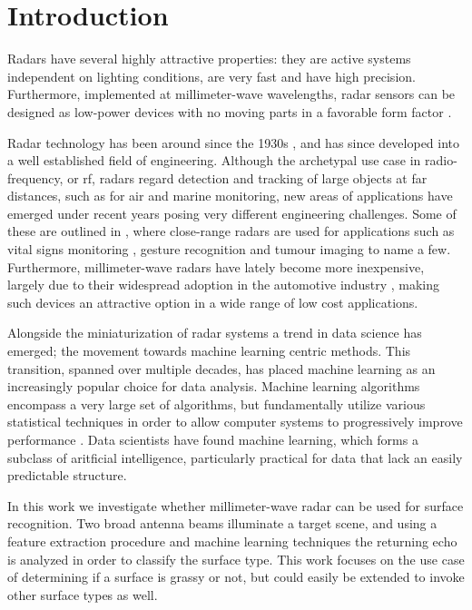 \chapter{Introduction}


Radars have several highly attractive properties: they are active systems independent on lighting conditions, are very fast and have high precision. Furthermore, implemented at millimeter-wave wavelengths, radar sensors can be designed as low-power devices with no moving parts in a favorable form factor \citep{lien_gillian_karagozler_amihood_schwesig_olson_raja_poupyrev_2016}.

Radar technology has been around since the 1930s \citep{watson-watt_1945}, and has since developed into a well established field of engineering. Although the archetypal use case in radio-frequency, or \gls{rf}, radars regard detection and tracking of large objects at far distances, such as for air and marine monitoring, new areas of applications have emerged under recent years posing very different engineering challenges. Some of these are outlined in \citep{amin_2017}, where close-range radars are used for applications such as vital signs monitoring \citep{kuo_lin_yu_lo_lyu_chou_chuang_2016}, gesture recognition \citep{lien_gillian_karagozler_amihood_schwesig_olson_raja_poupyrev_2016} and tumour imaging \citep{klemm_gibbins_leendertz_horseman_preece_benjamin_craddock_2011} to name a few. Furthermore, millimeter-wave radars have lately become more inexpensive, largely due to their widespread adoption in the automotive industry \citep{frenzel_2018}, making such devices an attractive option in a wide range of low cost applications.

Alongside the miniaturization of radar systems a trend in data science has emerged; the movement towards machine learning centric methods. This transition, spanned over multiple decades, has placed machine learning as an increasingly popular choice for data analysis. Machine learning algorithms encompass a very large set of algorithms, but fundamentally utilize various statistical techniques in order to allow computer systems to progressively improve performance \citep{a_smola_svn_vishwanathan_2010}. Data scientists have found machine learning, which forms a subclass of aritficial intelligence, particularly practical for data that lack an easily predictable structure.

In this work we investigate whether millimeter-wave radar can be used for surface recognition. Two broad antenna beams illuminate a target scene, and using a feature extraction procedure and machine learning techniques the returning echo is analyzed in order to classify the surface type. This work focuses on the use case of determining if a surface is grassy or not, but could easily be extended to invoke other surface types as well.  

